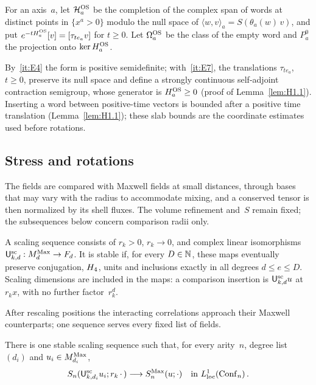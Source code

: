 \begin{definition}\label{def:D14}
For an axis~$a$, let $\mathcal H_a^{\rm OS}$ be the completion of the complex span of words at distinct points in $\{x^a>0\}$ modulo the null space of $\langle w,v\rangle_a=S(\theta_a(w)\,v)$, and put $e^{-tH_a^{\rm OS}}[v]=[\tau_{te_a}v]$ for $t\ge0$. Let $\Omega_a^{\rm OS}$ be the class of the empty word and $P^0_a$ the projection onto $\ker H_a^{\rm OS}$.
\end{definition}

By~\ref{it:E4} the form is positive semidefinite; with~\ref{it:E7}, the translations $\tau_{te_a}$, $t\ge0$, preserve its null space and define a strongly continuous self-adjoint contraction semigroup, whose generator is $H_a^{\rm OS}\ge0$ (proof of Lemma~\ref{lem:H1.1}). Inserting a word between positive-time vectors is bounded after a positive time translation (Lemma~\ref{lem:H1.1}); these slab bounds are the coordinate estimates used before rotations.

\subsection{Stress and rotations}\label{sec:stress}

The fields are compared with Maxwell fields at small distances, through bases that may vary with the radius to accommodate mixing, and a conserved tensor is then normalized by its shell fluxes. The volume refinement and~$S$ remain fixed; the subsequences below concern comparison radii only.

\begin{definition}\label{def:D12}
A scaling sequence consists of $r_k>0$, $r_k\to0$, and complex linear isomorphisms $\mathsf{U}_{k,d}^{\mathrm{sc}}:M_{d}^{\mathrm{Max}}\to F_d$. It is stable if, for every $D\in\mathbb{N}$, these maps eventually preserve conjugation, $H_4$, units and inclusions exactly in all degrees $d\le e\le D$. Scaling dimensions are included in the maps: a comparison insertion is $\mathsf{U}_{k,d}^{\mathrm{sc}}u$ at~$r_kx$, with no further factor~$r_k^d$.
\end{definition}

After rescaling positions the interacting correlations approach their Maxwell counterparts; one sequence serves every fixed list of fields.

\begin{proposition}\label{prop:MC}
There is one stable scaling sequence such that, for every arity~$n$, degree list $(d_i)$ and $u_i\in M_{d_i}^{\mathrm{Max}}$,
\begin{equation*}
S_n(\mathsf{U}_{k,d_i}^{\mathrm{sc}}u_i;r_k\,\cdot\,)\longrightarrow S^{\mathrm{Max}}_n(u;\cdot)
\quad\text{in }L^1_{\rm loc}(\mathrm{Conf}_{n})\,.
\end{equation*}
\end{proposition}

